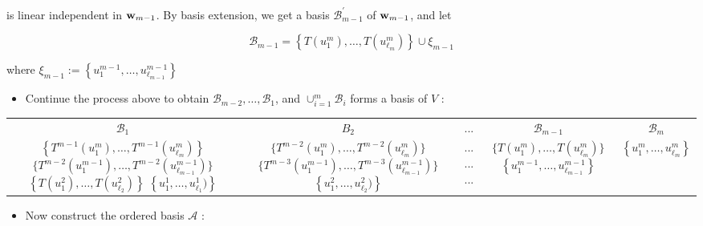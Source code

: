 \documentclass[11pt]{article}
\begin{document}
is linear independent in \({\bf w}_{m - 1}\). By basis extension, we get a basis \({\mathcal{B}}_{m - 1}^{\prime }\) of \({\bf w}_{m - 1}\), and let

\[
{\mathcal{B}}_{m - 1} = \left\{  {T\left( {u}_1^{m}\right) ,\ldots ,T\left( {u}_{{\ell }_{m}}^{m}\right) }\right\}   \cup  {\xi }_{m - 1}
\]

where \({\xi }_{m - 1} \mathrel{\text{ := }} \left\{  {{u}_1^{m - 1},\ldots ,{u}_{{\ell }_{m - 1}}^{m - 1}}\right\}\)

\begin{itemize}
\item Continue the process above to obtain \({\mathcal{B}}_{m - 2},\ldots ,{\mathcal{B}}_1\), and \({ \cup  }_{i = 1}^{m}{\mathcal{B}}_{i}\) forms a basis of \(V\) :
\end{itemize}

\begin{center}
{
\begin{tabular}{|c|c|c|c|c|}
\hline
\({\mathcal{B}}_1\) & \({B}_2\) & ... & \({\mathcal{B}}_{m - 1}\) & \({\mathcal{B}}_{m}\) \\
\cline{1-5}
\(\left\{  {{T}^{m - 1}\left( {u}_1^{m}\right) ,\ldots ,{T}^{m - 1}\left( {u}_{{\ell }_{m}}^{m}\right) }\right\}\)  \(\{ {T}^{m - 2}\left( {u}_1^{m - 1}\right) ,\ldots ,{T}^{m - 2}\left( {u}_{{\ell }_{m - 1}}^{m - 1}\right) \}\)  \(\left\{  {T\left( {u}_1^2\right) ,\ldots ,T\left( {u}_{{\ell }_2}^2\right) }\right\}\)  \(\left\{  {{u}_1^1,\ldots ,{u}_{{\ell }_1}^1)}\right\}\) & \(\{ {T}^{m - 2}({u}_1^{m}),\ldots ,{T}^{m - 2}({u}_{{\ell }_{m}}^{m})\}\)  \(\{ {T}^{m - 3}({u}_1^{m - 1}),\ldots ,{T}^{m - 3}({u}_{{\ell }_{m - 1}}^{m - 1})\}\)  \(\left\{  {{u}_1^2,\ldots ,{u}_{{\ell }_2}^2)}\right\}\) & ... ... ... & \(\{ T\left( {u}_1^{m}\right) ,\ldots ,T\left( {u}_{{\ell }_{m}}^{m}\right) \}\)  \(\left\{  {{u}_1^{m - 1},\ldots ,{u}_{{\ell }_{m - 1}}^{m - 1}}\right\}\) & \(\left\{  {{u}_1^{m},\ldots ,{u}_{{\ell }_{m}}^{m}}\right\}\) \\
\cline{1-5}
\hline
\end{tabular}
}
\end{center}

\begin{itemize}
\item Now construct the ordered basis \(\mathcal{A}\) :
\end{itemize}
\end{document}
